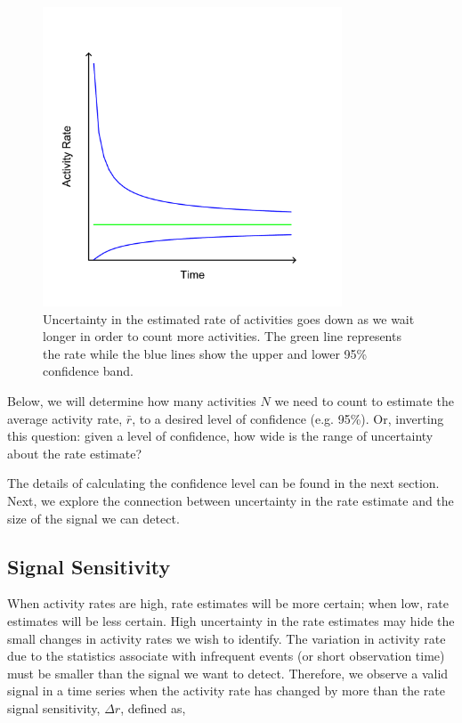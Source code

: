\documentclass{article}
\begin{document}
%
\begin{figure}[h]
	\begin{center}
		\includegraphics[width=3.5in]{./imgs/fig2.pdf}
	\end{center}
	\caption{Uncertainty in the estimated rate of activities goes down as we wait longer in order to count more activities.  The green line
represents the rate while the blue lines show the upper and lower 95\% confidence band. }
    	\label{fig:confidence}
\end{figure}
%
%

Below, we will determine how many activities $N$ we need to count to estimate the average activity rate, $\bar{r}$, to a desired level
of confidence (e.g. 95\%). Or, inverting this question: given a level of confidence, how wide is the range of uncertainty
about the rate estimate?

The details of calculating the confidence level can be found in the next section.  Next, we explore the connection between
uncertainty in the rate estimate and the size of the signal we can detect.

%
%

\subsection{Signal Sensitivity}

When activity rates are high, rate estimates will be more certain; when low, rate estimates will be less certain. High uncertainty
in the rate estimates may hide the small changes in activity rates we wish to identify.  The variation in activity rate due to the statistics
associate with infrequent events (or short observation time) must be smaller than the signal we want to detect. Therefore, we observe
a valid signal in a time series when the activity rate has changed by more than the rate signal sensitivity, $\Delta r$, defined as,
\end{document}
